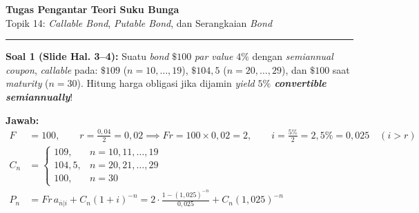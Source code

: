 \documentclass[10.5pt,a4paper]{article}
\begin{document}
\begin{center}
    {\Large \textbf{Tugas Pengantar Teori Suku Bunga}}\\[0.2em]
    {\normalsize Topik 14: \textit{Callable Bond}, \textit{Putable Bond}, dan Serangkaian \textit{Bond}}
\end{center}
\vspace{-0.3em}
\hrule
\vspace{0.5em}

\begin{tcolorbox}
\textbf{Soal 1 (Slide Hal. 3--4):} Suatu \textit{bond} $\$100$ \textit{par value} $4\%$ dengan \textit{semiannual coupon}, \textit{callable} pada: $\$109$ ($n = 10,\dots,19$), $\$104{,}5$ ($n = 20,\dots,29$), dan $\$100$ saat \textit{maturity} ($n = 30$). Hitung harga obligasi jika dijamin \textit{yield} \textbf{$5\%$ \textit{convertible semiannually}}!
\end{tcolorbox}

\textbf{Jawab:}
\begin{align*}
    F &= 100, \qquad r = \frac{0{,}04}{2} = 0{,}02 \implies Fr = 100 \times 0{,}02 = 2, \qquad i = \frac{5\%}{2} = 2{,}5\% = 0{,}025 \quad (i > r) \\[0.2em]
    C_n &= \begin{cases}
        109, & n = 10, 11, \dots, 19 \\
        104{,}5, & n = 20, 21, \dots, 29 \\
        100, & n = 30
    \end{cases} \\[0.3em]
    P_n &= Fr \, a_{\overline{n}|i} + C_n(1 + i)^{-n} = 2 \cdot \frac{1 - (1{,}025)^{-n}}{0{,}025} + C_n(1{,}025)^{-n}
\end{align*}
\end{document}
